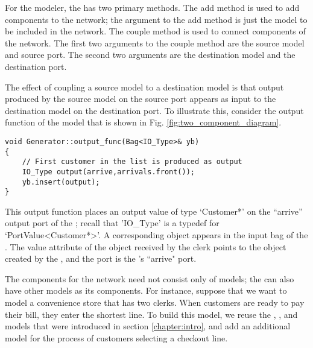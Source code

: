 For the modeler, the  has two primary methods. The add method is used to add components to the network; the argument to the add method is just the model to be included in the network. The couple method is used to connect components of the network. The first two arguments to the couple method are the source model and source port. The second two arguments are the destination model and the destination port.
 
The effect of coupling a source model to a destination model is that output produced by the source model on the source port appears as input to the destination model on the destination port. To illustrate this, consider the output function of the  model that is shown in Fig. \ref{fig:two_component_diagram}.
\begin{verbatim}
void Generator::output_func(Bag<IO_Type>& yb)
{
    // First customer in the list is produced as output
    IO_Type output(arrive,arrivals.front());
    yb.insert(output);
}
\end{verbatim}

This output function places an output value of type `Customer*' on the ``arrive'' output port of the ; recall that 'IO\_Type' is a typedef for `PortValue<Customer*>'. A corresponding  object appears in the input bag of the . The value attribute of the  object received by the clerk points to the  object created by the , and the port is the 's ``arrive" port.

The components for the network need not consist only of  models; the  can also have other  models as its components. For instance, suppose that we want to model a convenience store that has two clerks. When customers are ready to pay their bill, they enter the shortest line. To build this model, we reuse the , , and  models that were introduced in section \ref{chapter:intro}, and add an additional model for the process of customers selecting a checkout line.

